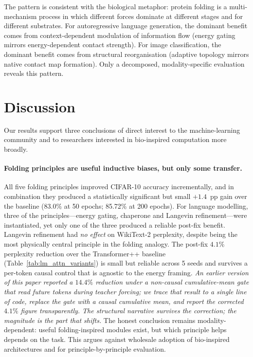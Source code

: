 \documentclass[fleqn,10pt]{article}
\begin{document}
The pattern is consistent with the biological metaphor: protein
folding is a multi-mechanism process in which different forces
dominate at different stages and for different substrates. For
autoregressive language generation, the dominant benefit comes from
context-dependent modulation of information flow (energy gating
mirrors energy-dependent contact strength). For image
classification, the dominant benefit comes from structural
reorganisation (adaptive topology mirrors native contact map
formation). Only a decomposed, modality-specific evaluation reveals
this pattern.

\section*{Discussion}
\label{sec:discussion}

Our results support three conclusions of direct interest to the
machine-learning community and to researchers interested in
bio-inspired computation more broadly.

\paragraph{Folding principles are useful inductive biases, but only some transfer.}
All five folding principles improved CIFAR-10 accuracy
incrementally, and in combination they produced a statistically
significant but small $+1.4$~pp gain over the baseline (83.0\% at
50 epochs; 85.72\% at 200 epochs). For language modelling, three of
the principles---energy gating, chaperone and Langevin
refinement---were instantiated, yet only one of the three
produced a reliable post-fix benefit. Langevin refinement had
\emph{no effect} on WikiText-2 perplexity, despite being the most
physically central principle in the folding analogy. The
post-fix $4.1\%$ perplexity reduction over the Transformer++
baseline (Table~\ref{tab:lm_attn_variants}) is small but reliable
across 5 seeds and survives a per-token causal control that is
agnostic to the energy framing. \emph{An earlier version of this
paper reported a $14.4\%$ reduction under a non-causal cumulative-mean
gate that read future tokens during teacher forcing; we trace that
result to a single line of code, replace the gate with a causal
cumulative mean, and report the corrected $4.1\%$ figure
transparently. The structural narrative survives the correction;
the magnitude is the part that shifts.} The honest conclusion
remains modality-dependent: useful folding-inspired modules exist,
but which principle helps depends on the task. This argues against
wholesale adoption of bio-inspired architectures and
for principle-by-principle evaluation.
\end{document}
